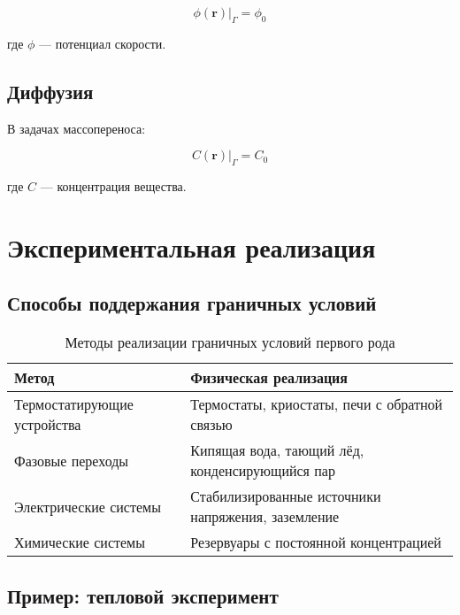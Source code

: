 \documentclass[12pt]{article}
\begin{document}
	\[
	\phi(\mathbf{r})|_{\Gamma} = \phi_0
	\]
	
	где $\phi$ — потенциал скорости.
	
	\subsection{Диффузия}
	
	В задачах массопереноса:
	
	\[
	C(\mathbf{r})|_{\Gamma} = C_0
	\]
	
	где $C$ — концентрация вещества.
	
	\section{Экспериментальная реализация}
	
	\subsection{Способы поддержания граничных условий}
	
	\begin{table}[H]
		\centering
		\caption{Методы реализации граничных условий первого рода}
		\begin{tabular}{|p{}|p{}|}
			\hline
			\textbf{Метод} & \textbf{Физическая реализация} \\
			\hline
			Термостатирующие устройства & Термостаты, криостаты, печи с обратной связью \\
			\hline
			Фазовые переходы & Кипящая вода, тающий лёд, конденсирующийся пар \\
			\hline
			Электрические системы & Стабилизированные источники напряжения, заземление \\
			\hline
			Химические системы & Резервуары с постоянной концентрацией \\
			\hline
		\end{tabular}
	\end{table}
	
	\subsection{Пример: тепловой эксперимент}
	
\end{document}
